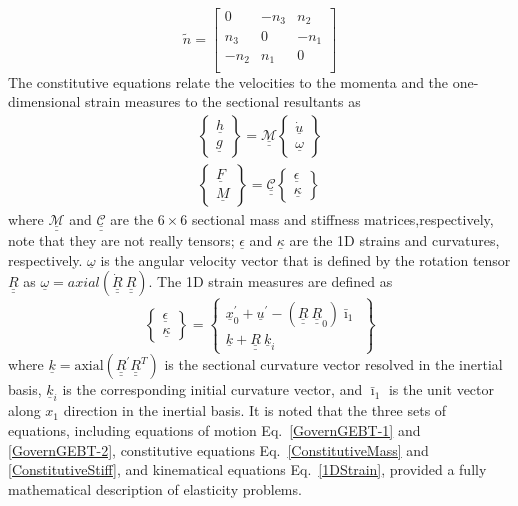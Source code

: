\documentclass{aiaa-tc}
\newcommand{\tens}[1]{\underline{\underline{#1}}}
\renewcommand{\vec}[1]{\underline{#1}}
\renewcommand{\skew}[1]{\widetilde{#1}}
\begin{document}
\[
	\skew{n} = 
	     		\begin{bmatrix}
			0 & -n_3 & n_2 \\
			n_3 & 0 & -n_1 \\
			-n_2 & n_1 & 0\\
			\end{bmatrix}	
\]
The constitutive equations relate the velocities to the momenta and the one-dimensional strain measures to the sectional resultants as
\begin{align}
	\label{ConstitutiveMass}
	\begin{Bmatrix}
	\underline{h} \\
	\underline{g}
	\end{Bmatrix}
	= \underline{\underline{\mathcal{M}}} \begin{Bmatrix}
	\dot{\underline{u}} \\
	\underline{\omega}
	\end{Bmatrix} \\
	\label{ConstitutiveStiff}
	\begin{Bmatrix}
	\underline{F} \\
	\underline{M}
	\end{Bmatrix}
	= \underline{\underline{\mathcal{C}}} \begin{Bmatrix}
	\underline{\epsilon} \\
	\underline{\kappa}
	\end{Bmatrix}
\end{align}
where $\underline{\underline{\mathcal{M}}}$ and $\underline{\underline{\mathcal{C}}}$ are the $6 \times 6$ sectional mass and stiffness matrices,respectively, note that they are not really tensors; $\underline{\epsilon}$ and $\underline{\kappa}$ are the 1D strains and curvatures, respectively. $\underline{\omega}$ is the angular velocity vector that is defined by the rotation tensor $\underline{\underline{R}}$ as $\underline{\omega} = axial(\dot{\underline{\underline{R}}}~\underline{\underline{R}})$. The 1D strain measures are defined as
\begin{equation}
    \label{1DStrain}
    \begin{Bmatrix}
        \vec{\epsilon} \\
        \vec{\kappa}
    \end{Bmatrix}
    =
    \begin{Bmatrix}
        \vec{x}^\prime_0 + \vec{u}^\prime - (\tens{R} ~\tens{R}_0) \bar{\imath}_1 \\
        \vec{k} + \tens{R}~ \vec{k}_i
    \end{Bmatrix}
\end{equation}
where $\vec{k} = \text{axial} (\tens{R}^\prime \tens{R}^T)$ is the sectional curvature vector resolved in the inertial basis, $\vec{k}_i$ is the corresponding initial curvature vector, and $\bar{\imath}_1$ is the unit vector along $x_1$ direction in the inertial basis. It is noted that the three sets of equations, including equations of motion Eq.~\eqref{GovernGEBT-1} and \eqref{GovernGEBT-2}, constitutive equations Eq.~\eqref{ConstitutiveMass} and \eqref{ConstitutiveStiff}, and kinematical equations Eq.~\eqref{1DStrain}, provided a fully mathematical description of elasticity problems. 
\end{document}
